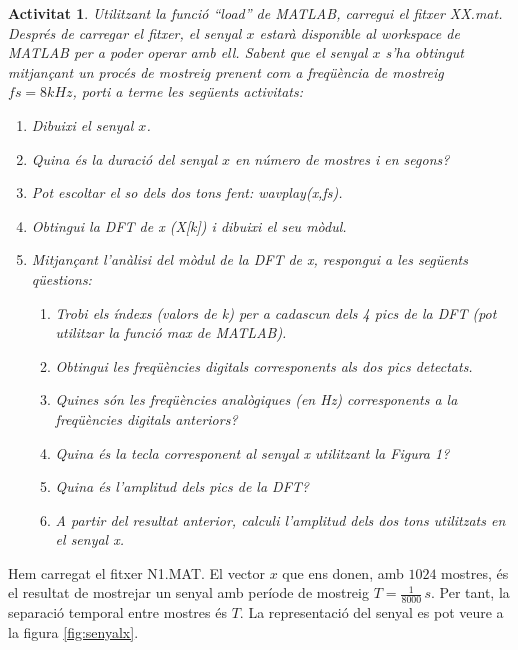 \documentclass[11pt,a4]{article}
\numberwithin{equation}{section}
\theoremstyle{thmstyle}
\theoremstyle{thmstyle}
\theoremstyle{thmstyle}
\theoremstyle{thmstyle}
\theoremstyle{thmstyle}
\theoremstyle{thmstyle}
\theoremstyle{thmstyle}
\newtheorem{activity}{Activitat}
\begin{document}
\begin{activity}
Utilitzant la funció “load” de MATLAB, carregui el fitxer XX.mat. Després de carregar el fitxer, el senyal $x$ estarà disponible al workspace de MATLAB per a poder operar amb ell. Sabent que el senyal $x$ s’ha obtingut mitjançant un procés de mostreig prenent com a freqüència de mostreig $fs = 8 kHz$, porti a terme les següents activitats:
\begin{enumerate}[-]
\item Dibuixi el senyal $x$.
\item Quina és la duració del senyal $x$ en número de mostres i en segons?
\item Pot escoltar el so dels dos tons fent: wavplay(x,fs).
\item Obtingui la DFT de x (X[k]) i dibuixi el seu mòdul.
\item Mitjançant l’anàlisi del mòdul de la DFT de x, respongui a les següents qüestions:
\begin{enumerate}[$\circ$]
\item Trobi els índexs (valors de k) per a cadascun dels 4 pics de la DFT (pot utilitzar
la funció max de MATLAB).
\item Obtingui les freqüències digitals corresponents als dos pics detectats.
\item Quines són les freqüències analògiques (en Hz) corresponents a la freqüències
digitals anteriors?
\item Quina és la tecla corresponent al senyal x utilitzant la Figura 1?
\item Quina és l’amplitud dels pics de la DFT?
\item A partir del resultat anterior, calculi l’amplitud dels dos tons utilitzats en el
senyal x.
\end{enumerate}
\end{enumerate}
\end{activity}

Hem carregat el fitxer N1.MAT. El vector $x$ que ens donen, amb $1024$ mostres, és el resultat de mostrejar un senyal amb període de mostreig $T=\frac{1}{8000}\,s$. Per tant, la separació temporal entre mostres és $T$. La representació del senyal es pot veure a la figura \ref{fig:senyalx}.
\\
\end{document}
